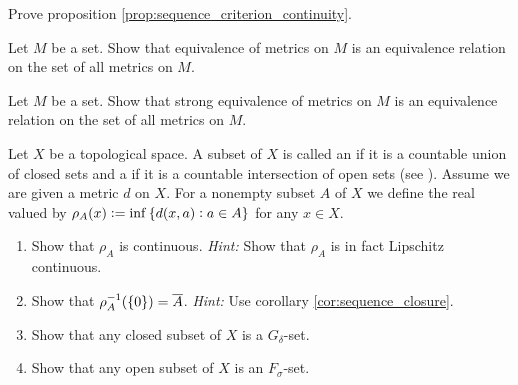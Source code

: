 \begin{exercise}
	Prove proposition \ref{prop:sequence_criterion_continuity}.
\end{exercise}

\begin{exercise}
	Let $M$ be a set. Show that equivalence of metrics on $M$ is an equivalence relation on the set of all metrics on $M$.
\end{exercise}

\begin{exercise}
	Let $M$ be a set. Show that strong equivalence of metrics on $M$ is an equivalence relation on the set of all metrics on $M$.
\end{exercise}

\begin{exercise}
	Let $X$ be a topological space. A subset of $X$ is called an  if it is a countable union of closed sets and a  if it is a countable intersection of open sets (see \cite[61]{aliprantis:principles_of_real_analysis:1998}). Assume we are given a metric $d$ on $X$. For a nonempty subset $A$ of $X$ we define the real valued  by $\rho_A(x) := \inf\cbr[0]{d(x,a) : a \in A}$ for any $x \in X$.

	\begin{enumerate}[label = (\alph*)]
		\item Show that $\rho_A$ is continuous. \textit{Hint:} Show that $\rho_A$ is in fact Lipschitz continuous.
		\item Show that $\rho_A^{-1}(\cbr[0]{0}) = \overline{A}$. \textit{Hint:} Use corollary \ref{cor:sequence_closure}.
		\item Show that any closed subset of $X$ is a $G_\delta$-set. 
		\item Show that any open subset of $X$ is an $F_\sigma$-set.
	\end{enumerate}
\end{exercise}
